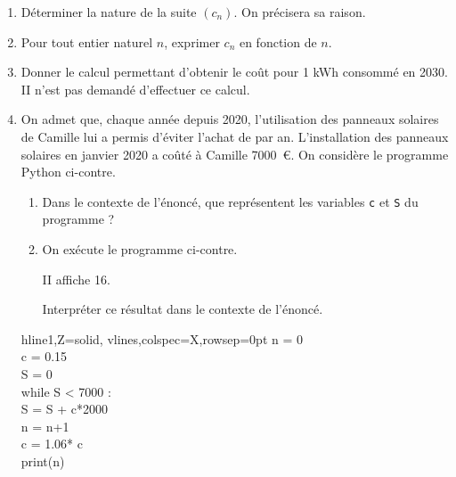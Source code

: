 \begin{enumerate}
	\item Déterminer la nature de la suite $\left(c_{n}\right)$. On précisera sa raison.

	\item Pour tout entier naturel $n$, exprimer $c_{n}$ en fonction de $n$.

	\item Donner le calcul permettant d'obtenir le coût pour 1 kWh consommé en 2030. II n'est pas demandé d'effectuer ce calcul.

	\item On admet que, chaque année depuis 2020, l'utilisation des panneaux solaires de Camille lui a permis d'éviter l'achat de  par an.
	L'installation des panneaux solaires en janvier 2020 a coûté à Camille 7000~\euro{}.
	On considère le programme Python ci-contre.

	\begin{minipage}{0.5\linewidth}
		\begin{enumerate}
			\item Dans le contexte de l'énoncé, que représentent les variables \texttt{c} et \texttt{S} du programme ?

			\item On exécute le programme ci-contre.

			II affiche 16.

			Interpréter ce résultat dans le contexte de l'énoncé.
		\end{enumerate}
	\end{minipage}
\hfill
\begin{minipage}{0.37\linewidth}
\hfill
\begin{ttfamily}%
\begin{tblr}{hline{1,Z}={solid}, vlines,colspec={X},rowsep=0pt}%
	n = 0\\
	c = 0.15\\
	S = 0\\
	while S < 7000 :\\
	\qquad S = S + c*2000\\
	\qquad n = n+1\\
	\qquad c = 1.06* c\\
	print(n)\\
\end{tblr}
\end{ttfamily}
\end{minipage}
\hfill~
\end{enumerate}
